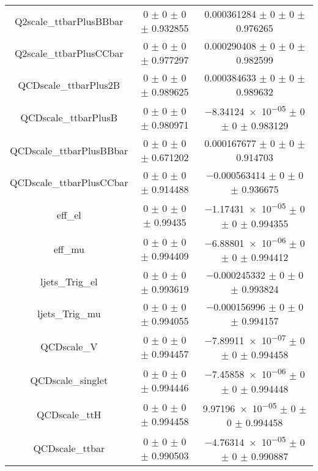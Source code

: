 \begin{table}
\begin{tabular}{ccc}
Q2scale\_ttbarPlusBBbar & \num{0} $\pm$ \num{0} $\pm$ \num{0} $\pm$ \num{0.932855} & \num{0.000361284} $\pm$ \num{0} $\pm$ \num{0} $\pm$ \num{0.976265}\\
Q2scale\_ttbarPlusCCbar & \num{0} $\pm$ \num{0} $\pm$ \num{0} $\pm$ \num{0.977297} & \num{0.000290408} $\pm$ \num{0} $\pm$ \num{0} $\pm$ \num{0.982599}\\
QCDscale\_ttbarPlus2B & \num{0} $\pm$ \num{0} $\pm$ \num{0} $\pm$ \num{0.989625} & \num{0.000384633} $\pm$ \num{0} $\pm$ \num{0} $\pm$ \num{0.989632}\\
QCDscale\_ttbarPlusB & \num{0} $\pm$ \num{0} $\pm$ \num{0} $\pm$ \num{0.980971} & \num{-8.34124e-05} $\pm$ \num{0} $\pm$ \num{0} $\pm$ \num{0.983129}\\
QCDscale\_ttbarPlusBBbar & \num{0} $\pm$ \num{0} $\pm$ \num{0} $\pm$ \num{0.671202} & \num{0.000167677} $\pm$ \num{0} $\pm$ \num{0} $\pm$ \num{0.914703}\\
QCDscale\_ttbarPlusCCbar & \num{0} $\pm$ \num{0} $\pm$ \num{0} $\pm$ \num{0.914488} & \num{-0.000563414} $\pm$ \num{0} $\pm$ \num{0} $\pm$ \num{0.936675}\\
eff\_el & \num{0} $\pm$ \num{0} $\pm$ \num{0} $\pm$ \num{0.99435} & \num{-1.17431e-05} $\pm$ \num{0} $\pm$ \num{0} $\pm$ \num{0.994355}\\
eff\_mu & \num{0} $\pm$ \num{0} $\pm$ \num{0} $\pm$ \num{0.994409} & \num{-6.88801e-06} $\pm$ \num{0} $\pm$ \num{0} $\pm$ \num{0.994412}\\
ljets\_Trig\_el & \num{0} $\pm$ \num{0} $\pm$ \num{0} $\pm$ \num{0.993619} & \num{-0.000245332} $\pm$ \num{0} $\pm$ \num{0} $\pm$ \num{0.993824}\\
ljets\_Trig\_mu & \num{0} $\pm$ \num{0} $\pm$ \num{0} $\pm$ \num{0.994055} & \num{-0.000156996} $\pm$ \num{0} $\pm$ \num{0} $\pm$ \num{0.994157}\\
QCDscale\_V & \num{0} $\pm$ \num{0} $\pm$ \num{0} $\pm$ \num{0.994457} & \num{-7.89911e-07} $\pm$ \num{0} $\pm$ \num{0} $\pm$ \num{0.994458}\\
QCDscale\_singlet & \num{0} $\pm$ \num{0} $\pm$ \num{0} $\pm$ \num{0.994446} & \num{-7.45858e-06} $\pm$ \num{0} $\pm$ \num{0} $\pm$ \num{0.994448}\\
QCDscale\_ttH & \num{0} $\pm$ \num{0} $\pm$ \num{0} $\pm$ \num{0.994458} & \num{9.97196e-05} $\pm$ \num{0} $\pm$ \num{0} $\pm$ \num{0.994458}\\
QCDscale\_ttbar & \num{0} $\pm$ \num{0} $\pm$ \num{0} $\pm$ \num{0.990503} & \num{-4.76314e-05} $\pm$ \num{0} $\pm$ \num{0} $\pm$ \num{0.990887}\\

\end{tabular}
\end{table}
